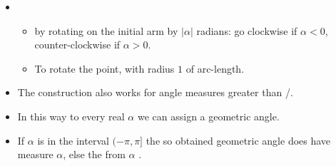\begin{frame}
\begin{itemize}
\item[]
\begin{itemize}
\item<4->  by rotating  on the initial arm by $|\alpha|$ radians: go clockwise if $\alpha<0$, counter-clockwise if $\alpha>0$.
\item<5-> To rotate the point,  with radius $1$  of arc-length.
\end{itemize}
\item<8-> The construction also works for angle measures greater than /.
\item<12-> In this way to every real $\alpha$ we can assign a geometric angle.
\item<13-> If $\alpha$ is in the interval $(-\pi, \pi]$ the so obtained geometric angle does have measure $\alpha$, else the  from $\alpha$ .
\end{itemize}
\end{frame}
